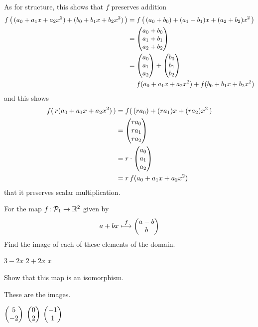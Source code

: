 \begin{exercises}
\begin{answer}
\begin{exparts}
      As for structure,
      this shows that $f$ preserves addition
      \begin{align*}
        f\left(\,(a_0+a_1x+a_2x^2)+(b_0+b_1x+b_2x^2)\,\right)
        &=f\left(\,(a_0+b_0)+(a_1+b_1)x+(a_2+b_2)x^2\,\right)       \\
        &=\begin{pmatrix} a_0+b_0 \\ a_1+b_1 \\ a_2+b_2 \end{pmatrix}                    \\
        &=\begin{pmatrix} a_0 \\ a_1 \\ a_2 \end{pmatrix} +\begin{pmatrix} b_0 \\ b_1 \\ b_2 \end{pmatrix}   \\
        &=f(a_0+a_1x+a_2x^2)+f(b_0+b_1x+b_2x^2)
      \end{align*}
      and this shows 
      \begin{align*}
        f(\,r(a_0+a_1x+a_2x^2)\,)
        &=f(\,(ra_0)+(ra_1)x+(ra_2)x^2\,)    \\
        &=\begin{pmatrix} ra_0 \\ ra_1 \\ ra_2 \end{pmatrix}     \\
        &=r\cdot\begin{pmatrix} a_0 \\ a_1 \\ a_2 \end{pmatrix}     \\
        &=r\,f(a_0+a_1x+a_2x^2)
      \end{align*}   
      that it preserves scalar multiplication. 
    \end{exparts} 
   \end{answer}
  \recommended \item 
    For the map
    \( \mbox{$f\colon \mathcal{P}_1\to \mathbb{R}^2$} \) given by
    \begin{equation*}
       a+bx\stackrel{f}{\longmapsto}\begin{pmatrix} a-b \\ b \end{pmatrix}
    \end{equation*}
    Find the image of each of these elements of the domain.
    \begin{exparts*}
      \partsitem \( 3-2x \)
      \partsitem \( 2+2x \)
      \partsitem \( x \)
    \end{exparts*}
    Show that this map is an isomorphism.
    \begin{answer}
       These are the images.
       \begin{exparts*}
        \partsitem \( \begin{pmatrix} 5 \\ -2 \end{pmatrix} \)
        \partsitem \( \begin{pmatrix} 0 \\ 2 \end{pmatrix} \)
        \partsitem \( \begin{pmatrix} -1 \\ 1 \end{pmatrix} \)
      \end{exparts*}


\end{answer}
\end{exercises}
